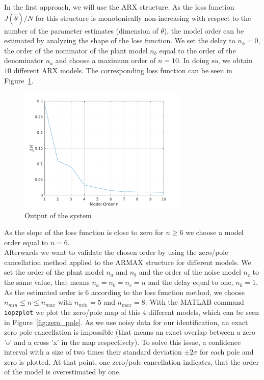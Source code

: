 \documentclass{scrartcl}
\begin{document}
In the first approach, we will use the ARX structure. As the loss function $ J(\hat{\theta}) /N $ for this structure is monotonically non-increasing with respect to the number of the parameter estimates (dimension of $\theta$), the model order can be estimated by analyzing the shape of the loss function. We set the delay to $n_k = 0$, the order of the nominator of the plant model $n_b$ equal to the order of the denominator $n_a$ and choose a maximum order of $n=10$. In doing so, we obtain $10$ different ARX models. The corresponding loss function can be seen in Figure~\ref{fig:loss_fcn}. 

\begin{figure}[h]
	\centering
	\includegraphics[height=6cm]{figures/Loss_fcn.pdf}
	\caption{Output of the system}\label{fig:loss_fcn}
\end{figure}

As the slope of the loss function is close to zero for $n \geq 6 $ we choose a model order equal to $n = 6.$ \\

Afterwards we want to validate the chosen order by using the zero/pole cancellation method applied to the ARMAX structure for different models. 
We set the order of the plant model $n_a$ and $n_b$ and the order of the noise model $n_c$ to the same value, that means $n_a = n_b = n_c = n $ and the delay equal to one, $n_k = 1$. 
As the estimated order is $6$ according to the loss function method, we choose $ n_{min} \leq n \leq n_{max}$ with $ n_{min} = 5$ and $n_{max}=8$. With the MATLAB command \texttt{iopzplot} we plot the zero/pole map of this $4$ different models, which can be seen in Figure~\ref{fig:zero_pole}. 
As we use noisy data for our identification, an exact zero pole cancellation is impossible (that means an exact overlap between a zero 'o' and a cross 'x' in the map respectively). To solve this issue, a confidence interval with a size of two times their standard deviation $\pm 2 \sigma$ for each pole and zero is plotted. At that point, one zero/pole cancellation indicates, that the order of the model is overestimated by one. 
\end{document}
